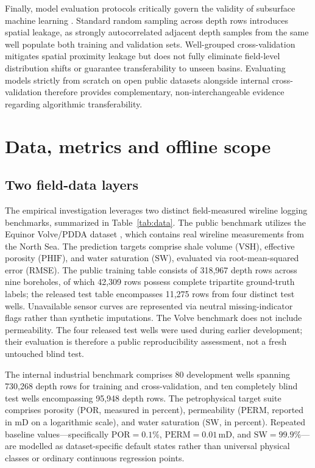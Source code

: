 \documentclass[preprint,12pt,nopreprintline]{elsarticle}
\begin{document}
Finally, model evaluation protocols critically govern the validity of subsurface machine learning \cite{pan2010survey,phoon2024trustworthy}. Standard random sampling across depth rows introduces spatial leakage, as strongly autocorrelated adjacent depth samples from the same well populate both training and validation sets. Well-grouped cross-validation mitigates spatial proximity leakage but does not fully eliminate field-level distribution shifts or guarantee transferability to unseen basins. Evaluating models strictly from scratch on open public datasets alongside internal cross-validation therefore provides complementary, non-interchangeable evidence regarding algorithmic transferability.

\section{Data, metrics and offline scope}
\label{sec:data}

\subsection{Two field-data layers}
The empirical investigation leverages two distinct field-measured wireline logging benchmarks, summarized in Table~\ref{tab:data}. The public benchmark utilizes the Equinor Volve/PDDA dataset \cite{volve2018,pddasig2021}, which contains real wireline measurements from the North Sea. The prediction targets comprise shale volume ($\mathrm{VSH}$), effective porosity ($\mathrm{PHIF}$), and water saturation ($\mathrm{SW}$), evaluated via root-mean-squared error (RMSE). The public training table consists of 318,967 depth rows across nine boreholes, of which 42,309 rows possess complete tripartite ground-truth labels; the released test table encompasses 11,275 rows from four distinct test wells. Unavailable sensor curves are represented via neutral missing-indicator flags rather than synthetic imputations. The Volve benchmark does not include permeability. The four released test wells were used during earlier development; their evaluation is therefore a public reproducibility assessment, not a fresh untouched blind test.

The internal industrial benchmark comprises 80 development wells spanning 730,268 depth rows for training and cross-validation, and ten completely blind test wells encompassing 95,948 depth rows. The petrophysical target suite comprises porosity ($\mathrm{POR}$, measured in percent), permeability ($\mathrm{PERM}$, reported in $\mathrm{mD}$ on a logarithmic scale), and water saturation ($\mathrm{SW}$, in percent). Repeated baseline values—specifically $\mathrm{POR}=0.1\%$, $\mathrm{PERM}=0.01\,\mathrm{mD}$, and $\mathrm{SW}=99.9\%$—are modelled as dataset-specific default states rather than universal physical classes or ordinary continuous regression points.
\end{document}
